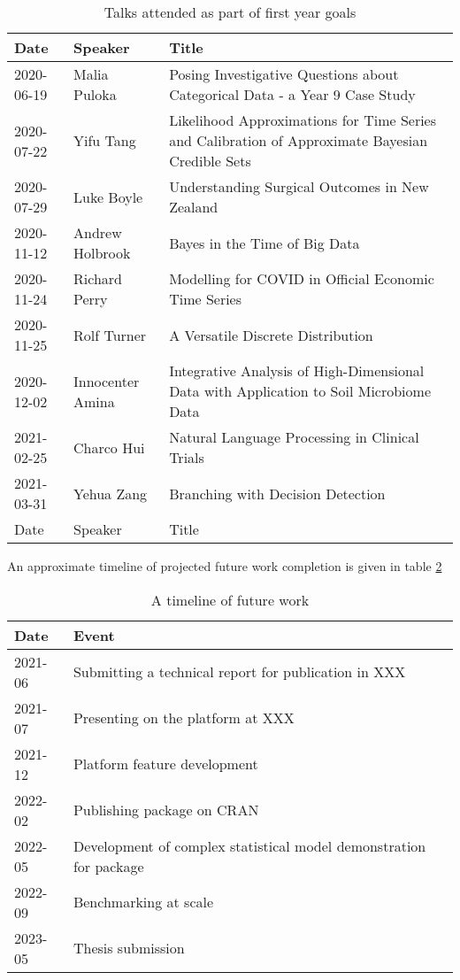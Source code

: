 \begin{table}[h]
        \centering
        \begin{tabularx}{\textwidth}{llX}
                \toprule
                Date & Speaker & Title\\
                \midrule
                2020-06-19 & Malia Puloka & Posing Investigative Questions about Categorical Data - a Year 9 Case Study\\
                2020-07-22 & Yifu Tang & Likelihood Approximations for Time Series and Calibration of Approximate Bayesian Credible Sets\\
                2020-07-29 & Luke Boyle & Understanding Surgical Outcomes in New Zealand\\
                2020-11-12 & Andrew Holbrook & Bayes in the Time of Big Data\\
                2020-11-24 & Richard Perry & Modelling for COVID in Official Economic Time Series\\
                2020-11-25 & Rolf Turner & A Versatile Discrete Distribution\\
                2020-12-02 & Innocenter Amina & Integrative Analysis of High-Dimensional Data with Application to Soil Microbiome Data\\
                2021-02-25 & Charco Hui & Natural Language Processing in Clinical Trials\\
                2021-03-31 & Yehua Zang & Branching with Decision Detection\\
                Date & Speaker & Title\\
                \bottomrule
        \end{tabularx}
        \caption{\label{talks}Talks attended as part of first year goals}
\end{table}

An approximate timeline of projected future work completion is given in table \ref{future-timeline}

\begin{table}[h]
        \centering
        \begin{tabularx}{\textwidth}{lX}
                \toprule
                Date & Event\\
                \midrule
                2021-06 & Submitting a technical report for publication in XXX\\
                2021-07 & Presenting on the platform at XXX\\
                2021-12 & Platform feature development\\
                2022-02 & Publishing package on CRAN\\
                2022-05 & Development of complex statistical model demonstration for package\\
                2022-09 & Benchmarking at scale\\
                2023-05 & Thesis submission\\
                \bottomrule
        \end{tabularx}
        \caption{\label{future-timeline}A timeline of future work}
\end{table}
